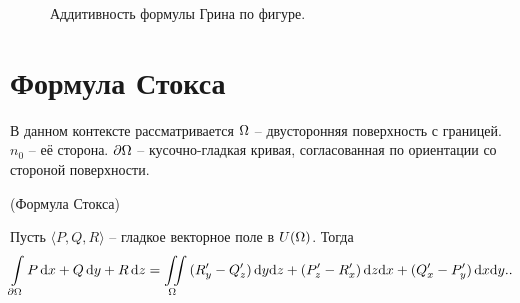 \begin{figure}[h!]
    \centering
    \caption{Аддитивность формулы Грина по фигуре.}
\end{figure}

\section{Формула Стокса}

\begin{remark}
    В данном контексте рассматривается $\Omega$ -- двусторонняя поверхность с границей.
    $n_0$ -- её сторона. $\partial \Omega$ -- кусочно-гладкая кривая, согласованная
    по ориентации со стороной поверхности.
\end{remark}

\begin{theorem}(Формула Стокса)

    Пусть $\langle P, Q, R \rangle$ -- гладкое векторное поле в $U(\Omega)$. Тогда
    \begin{align*}
        \int\limits_{\partial \Omega}{P \,\mathrm{d} x + Q \,\mathrm{d} y + R \,\mathrm{d} z} =
        \iint\limits_{\Omega}{(R'_y - Q'_z) \,\mathrm{d} y \mathrm{d} z + (P'_z - R'_x) \,\mathrm{d} z \mathrm{d} x + (Q'_x - P'_y) \,\mathrm{d} x \mathrm{d} y}
    ..\end{align*}
\end{theorem}

